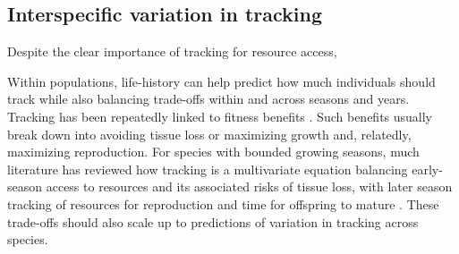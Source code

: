 \documentclass[11pt,letterpaper]{article}
\begin{document}
 
\subsection{Interspecific variation in tracking}
Despite the clear importance of tracking for resource access, 

Within populations, life-history can help predict how much individuals should track while also balancing trade-offs within and across seasons and years. Tracking has been repeatedly linked to fitness benefits \citep[e.g.,][]{farzan2018,deacy2018}. Such benefits usually break down into avoiding tissue loss or maximizing growth and, relatedly, maximizing reproduction. For species with bounded growing seasons, much literature has reviewed how tracking is a multivariate equation balancing early-season access to resources and its associated risks of tissue loss, with later season tracking of resources for reproduction and time for offspring to mature \citep{donohue2002,Morin:2005ye,Burghardt2015}. These trade-offs should also scale up to predictions of variation in tracking across species. %
\end{document}
